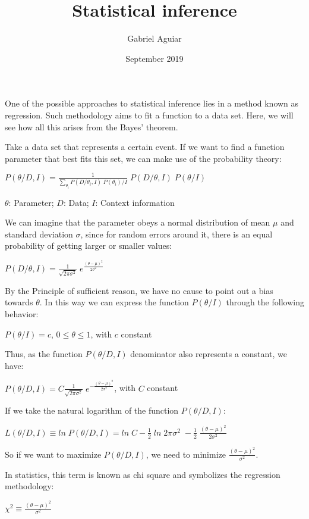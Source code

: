 \documentclass{article}
\title{Statistical inference}
\author{Gabriel Aguiar}
\date{September 2019}
\begin{document}
\maketitle

One of the possible approaches to statistical inference lies in a method known as regression. Such methodology aims to fit a function to a data set. Here, we will see how all this arises from the Bayes' theorem.

Take a data set that represents a certain event. If we want to find a function parameter that best fits this set, we can make use of the probability theory:

\hfill

$P(\theta/D,I) = \frac{1}{\sum\limits_{\theta_{i}} P(D/\theta_{i},I) \; P(\theta_{i})/I} \; P(D/\theta,I) \; P(\theta/I)$

\hfill

$\theta$: Parameter; $D$: Data; $I$: Context information

\hfill

We can imagine that the parameter obeys a normal distribution of mean $\mu$ and standard deviation $\sigma$, since for random errors around it, there is an equal probability of getting larger or smaller values:

\hfill

$P(D/\theta,I) = \frac{1}{\sqrt{2 \pi \sigma^{2}}} \; e^{\frac{(\theta - \mu)^{2}}{2 \sigma^{2}}}$

\hfill

By the Principle of sufficient reason, we have no cause to point out a bias towards $\theta$. In this way we can express the function $P(\theta/I)$ through the following behavior:

\hfill

$P(\theta/I) = c$, $0 \leq \theta \leq 1$, with $c$ constant

\hfill

Thus, as the function $P(\theta/D,I)$ denominator also represents a constant, we have:

\hfill

$P(\theta/D,I) = C \frac{1}{\sqrt{2 \pi \sigma^{2}}} \; e^{-\frac{(\theta - \mu)^{2}}{2 \sigma^{2}}}$, with $C$ constant

\hfill

If we take the natural logarithm of the function $P(\theta/D,I)$:

\hfill

$L(\theta/D,I) \equiv ln \; P(\theta/D,I) = ln \; C - \frac{1}{2} \; ln \; 2 \pi \sigma^{2} \; -\frac{1}{2} \; \frac{(\theta - \mu)^{2}}{2 \sigma^{2}}$

\hfill

So if we want to maximize $P(\theta/D,I)$, we need to minimize $\frac{(\theta - \mu)^{2}}{\sigma^{2}}$.

\hfill

In statistics, this term is known as chi square and symbolizes the regression methodology:

\hfill

$\chi^{2} \equiv \frac{(\theta - \mu)^{2}}{\sigma^{2}}$
\end{document}
